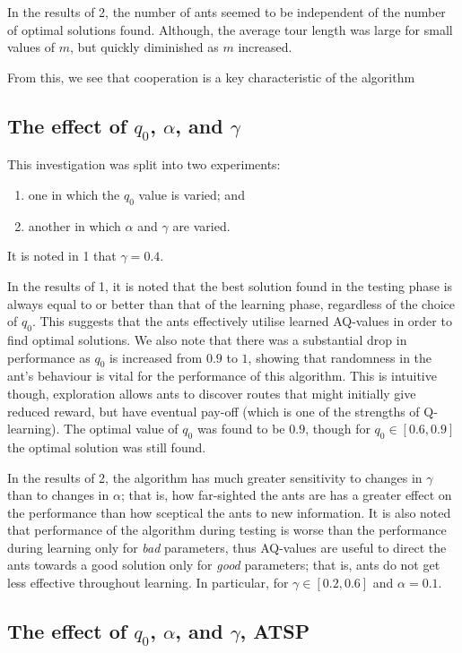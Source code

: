 In the results of 2, the number of ants seemed to be independent of the number of optimal solutions found. Although, the average tour length was large for small values of $m$, but quickly diminished as $m$ increased. 

From this, we see that cooperation is a key characteristic of the algorithm

\subsection{The effect of $q_0$, $\alpha$, and $\gamma$}

This investigation was split into two experiments:

\begin{enumerate}
    \item one in which the $q_0$ value is varied; and
    \item another in which $\alpha$ and $\gamma$ are varied. 
\end{enumerate}
It is noted in 1 that $\gamma = 0.4$.

In the results of 1, it is noted that the best solution found in the testing phase is always equal to or better than that of the learning phase, regardless of the choice of $q_0$. This suggests that the ants effectively utilise learned AQ-values in order to find optimal solutions. We also note that there was a substantial drop in performance as $q_0$ is increased from $0.9$ to $1$, showing that randomness in the ant's behaviour is vital for the performance of this algorithm. This is intuitive though, exploration allows ants to discover routes that might initially give reduced reward, but have eventual pay-off (which is one of the strengths of Q-learning). The optimal value of $q_0$ was found to be $0.9$, though for $q_0 \in [0.6, 0.9]$ the optimal solution was still found. 

In the results of 2, the algorithm has much greater sensitivity to changes in $\gamma$ than to changes in $\alpha$; that is, how far-sighted the ants are has a greater effect on the performance than how sceptical the ants to new information. It is also noted that performance of the algorithm during testing is worse than the performance during learning only for \emph{bad} parameters, thus AQ-values are useful to direct the ants towards a good solution only for \emph{good} parameters; that is, ants do not get less effective throughout learning. In particular, for $\gamma \in [0.2, 0.6]$ and $\alpha = 0.1$.

\subsection{The effect of $q_0$, $\alpha$, and $\gamma$, ATSP}

